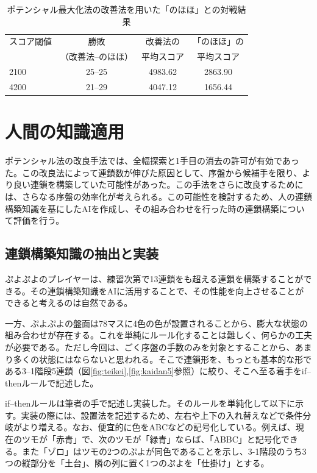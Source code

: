 \documentclass[12pt]{jreport}
\begin{document}
\begin{table}[tb]
\begin{center}
\caption{ポテンシャル最大化法の改善法を用いた「のほほ」との対戦結果} \label{tab:poten_vs}
  \begin{tabular}{|l|c|c|c|} \hline
スコア閾値 & 勝敗 & 改善法の & 「のほほ」の\\
 & （改善法--のほほ）& 平均スコア & 平均スコア\\ \hline
2100 & 25--25 & 4983.62 & 2863.90\\ \hline
4200 & 21--29 & 4047.12 & 1656.44\\ \hline
\end{tabular}
\end{center}
\end{table}


\chapter{人間の知識適用} \label{human} \setcounter{section}{0}
ポテンシャル法の改良手法では、全幅探索と1手目の消去の許可が有効であった。この改良法によって連鎖数が伸びた原因として、序盤から候補手を限り、より良い連鎖を構築していた可能性があった。この手法をさらに改良するためには、さらなる序盤の効率化が考えられる。この可能性を検討するため、人の連鎖構築知識を基にしたAIを作成し、その組み合わせを行った時の連鎖構築について評価を行う。

\section{連鎖構築知識の抽出と実装}
ぷよぷよのプレイヤーは、練習次第で13連鎖をも超える連鎖を構築することができる。その連鎖構築知識をAIに活用することで、その性能を向上させることができると考えるのは自然である。

一方、ぷよぷよの盤面は78マスに4色の色が設置されることから、膨大な状態の組み合わせが存在する。これを単純にルール化することは難しく、何らかの工夫が必要である。ただし今回は、ごく序盤の手数のみを対象とすることから、あまり多くの状態にはならないと思われる。そこで連鎖形を、もっとも基本的な形である3--1階段5連鎖（図\ref{fig:teikei},\ref{fig:kaidan5}参照）に絞り、そこへ至る着手をif--thenルールで記述した。

if--thenルールは筆者の手で記述し実装した。そのルールを単純化して以下に示す。実装の際には、設置法を記述するため、左右や上下の入れ替えなどで条件分岐がより増える。なお、便宜的に色をABCなどの記号化している。例えば、現在のツモが「赤青」で、次のツモが「緑青」ならば、「ABBC」と記号化できる。また「ゾロ」はツモの2つのぷよが同色であることを示し、3-1階段のうち3つの縦部分を「土台」、隣の列に置く1つのぷよを「仕掛け」とする。
\end{document}

